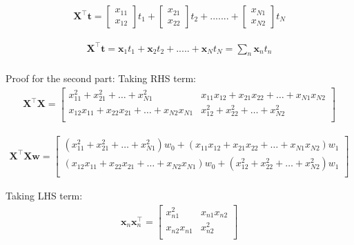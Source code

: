 \documentclass[10pt]{article}
\begin{document}
\begin{enumerate}
\begin{eqnarray*}
\mathbf{X}^\top \mathbf{t}= 
    \begin{bmatrix}
    x_{11} \\[0.3em]
    x_{12}
    \end{bmatrix}t_1 +
     \begin{bmatrix}
    x_{21} \\[0.3em]
    x_{22}
    \end{bmatrix}t_2 + .......+
     \begin{bmatrix}
    x_{N1} \\[0.3em]
    x_{N2}
    \end{bmatrix}t_N 
\end{eqnarray*}

\begin{eqnarray*}
\mathbf{X}^\top \mathbf{t}= 
\mathbf{x}_1 t_1+\mathbf{x}_2 t_2+ ..... + \mathbf{x}_N t_N = \sum_{n} \mathbf{x}_n t_n
\end{eqnarray*}
\\
Proof for the second part:
Taking RHS term:
\begin{eqnarray*}
\mathbf{X}^\top\mathbf{X} = 
    \begin{bmatrix}
    x_{11}^2+x_{21}^2+\hdots+x_{N1}^2 &  x_{11}x_{12}+x_{21}x_{22}+\hdots+x_{N1}x_{N2} \\[0.3em]
    x_{12}x_{11}+x_{22}x_{21}+\hdots+x_{N2}x_{N1} &  x_{12}^2+x_{22}^2+\hdots+x_{N2}^2\\[0.3em]
    \end{bmatrix}
    \end{eqnarray*} 
    
\begin{eqnarray*}
\mathbf{X}^\top\mathbf{X} \mathbf{w}= 
    \begin{bmatrix}
    \left(x_{11}^2+x_{21}^2+\hdots+x_{N1}^2\right)w_0 + \left( x_{11}x_{12}+x_{21}x_{22}+\hdots+x_{N1}x_{N2} \right)w_1\\[0.3em]
    \left(x_{12}x_{11}+x_{22}x_{21}+\hdots+x_{N2}x_{N1}\right)w_0 + \left( x_{12}^2+x_{22}^2+\hdots+x_{N2}^2\right)w_1\\[0.3em]
    \end{bmatrix}
    \end{eqnarray*} 

Taking LHS term:
\begin{eqnarray*}
\mathbf{x}_n \mathbf{x}_n^\top = 
    \begin{bmatrix}
   	x_{n1}^2 & x_{n1}x_{n2} \\[0.3em]
    x_{n2}x_{n1} &  x_{n2}^2\\[0.3em]
    \end{bmatrix}
    \end{eqnarray*} 
    

\end{enumerate}
\end{document}
